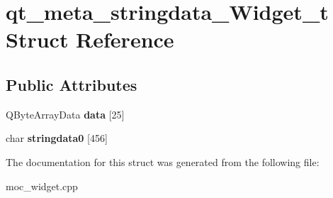 \hypertarget{structqt__meta__stringdata__Widget__t}{}\section{qt\+\_\+meta\+\_\+stringdata\+\_\+\+Widget\+\_\+t Struct Reference}
\label{structqt__meta__stringdata__Widget__t}
\subsection*{Public Attributes}
\begin{DoxyCompactItemize}
\item 
\mbox{\label{structqt__meta__stringdata__Widget__t_ae20db675ed9b937d9716063b95ec078e}} 
Q\+Byte\+Array\+Data {\bfseries data} \mbox{[}25\mbox{]}
\item 
\mbox{\label{structqt__meta__stringdata__Widget__t_a58b850d6408fcf54b7e522d778f530e6}} 
char {\bfseries stringdata0} \mbox{[}456\mbox{]}
\end{DoxyCompactItemize}


The documentation for this struct was generated from the following file\+:\begin{DoxyCompactItemize}
\item 
moc\+\_\+widget.\+cpp\end{DoxyCompactItemize}
